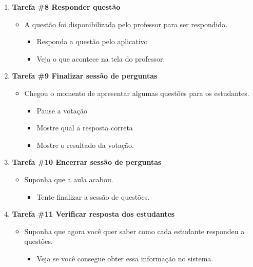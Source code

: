\begin{apendicesenv}
\begin{enumerate}
  \item \textbf{Tarefa \#8 Responder questão}
  \begin{itemize}
    \item A questão foi disponibilizada pelo professor para ser respondida.
    \begin{itemize}
      \item Responda a questão pelo aplicativo
      \item Veja o que acontece na tela do professor.
    \end{itemize}
  \end{itemize}

  \item \textbf{Tarefa \#9 Finalizar sessão de perguntas}
  \begin{itemize}
    \item Chegou o momento de apresentar algumas questões para os estudantes.
    \begin{itemize}
      \item Pause a votação
      \item Mostre qual a resposta correta
      \item Mostre o resultado da votação.
    \end{itemize}
  \end{itemize}

  \item \textbf{Tarefa \#10 Encerrar sessão de perguntas}
  \begin{itemize}
    \item Suponha que a aula acabou.
    \begin{itemize}
      \item Tente finalizar a sessão de questões.
    \end{itemize}
  \end{itemize}

  \item \textbf{Tarefa \#11 Verificar resposta dos estudantes}
  \begin{itemize}
    \item Suponha que agora você quer saber como cada estudante respondeu a questões.
    \begin{itemize}
      \item Veja se você consegue obter essa informação no sistema.
    \end{itemize}
  \end{itemize}
\end{enumerate}

\end{apendicesenv}
